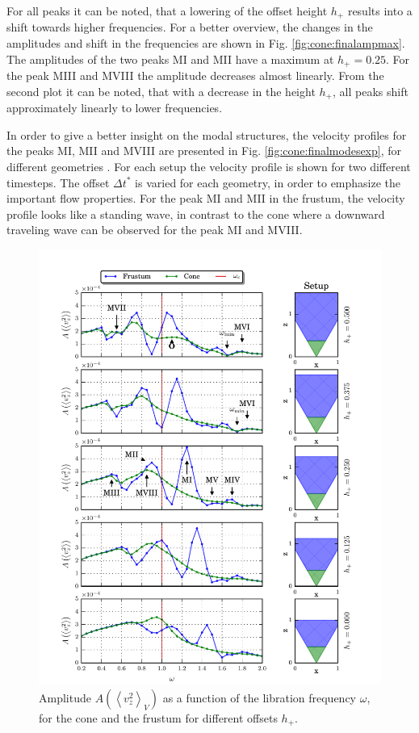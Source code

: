 For all peaks  it can be noted, that a lowering of the offset height $h_+$ results
into a shift towards higher frequencies. %
For a better overview, the changes in the amplitudes and shift in the frequencies are shown in
Fig. \ref{fig:cone:finalampmax}. %
The amplitudes of the two peaks M\RN{1} and M\RN{2} have a maximum at $h_+= 0.25$. For the peak M\RN{3} and M\RN{8} the amplitude decreases almost linearly.
From the second plot it can be noted, that with a decrease in the height $h_+$,
all peaks shift approximately linearly to lower frequencies.

In order to give a better insight on the modal structures, the velocity profiles for the peaks M\RN{1}, M\RN{2} and M\RN{8}
are presented in Fig. \ref{fig:cone:finalmodesexp}, for different geometries .
For each setup the velocity profile is shown for two different timesteps. The offset $\Delta t^*$ is varied  for each geometry, in order to emphasize
the important flow properties.
For the peak M\RN{1} and M\RN{2} in the frustum, the velocity profile looks like a standing wave,
in contrast to the cone where a downward traveling wave can be observed for the peak M\RN{1} and M\RN{8}.


\begin{figure}[!pt]
  \centering
  \includegraphics{gfx/cone/final/transition.pdf}
  \caption{
      \label{fig:cone:finaltransition}Amplitude $A\left(\left<v^2_z\right>_V\right)$ as a function of the libration frequency $\omega$,
      for the cone  and the frustum for different offsets $h_+$.
    }
\end{figure}
\clearpage

